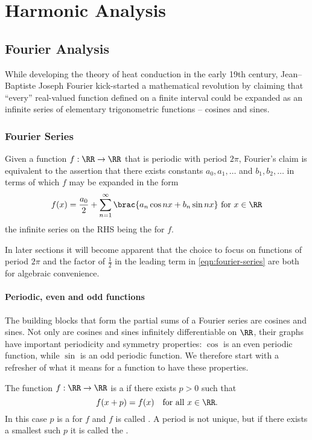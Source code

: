 \part{Harmonic Analysis}
\chapter{Fourier Analysis}
While developing the theory of heat conduction in the early 19th century, Jean--Baptiste Joseph Fourier kick-started a mathematical revolution by claiming that ``every'' real-valued function defined on a finite interval could be expanded as an infinite series of elementary trigonometric functions -- cosines and sines.

\section{Fourier Series}
Given a function $f:\RR\to\RR$ that is periodic with period $2\pi$, Fourier's claim is equivalent to the assertion that there exists constants $a_0,a_1,\dots$ and $b_1,b_2,\dots$ in terms of which $f$ may be expanded in the form
\begin{equation}\label{eqn:fourier-series}
f(x)=\frac{a_0}{2}+\sum_{n=1}^\infty\brac{a_n\cos nx+b_n\sin nx} \text{ for } x\in\RR
\end{equation}
the infinite series on the RHS being the  for $f$.

\begin{remark}
In later sections it will become apparent that the choice to focus on functions of period $2\pi$ and the factor of $\frac{1}{2}$ in the leading term in \cref{eqn:fourier-series} are both for algebraic convenience.
\end{remark}

\subsection{Periodic, even and odd functions}
The building blocks that form the partial sums of a Fourier series are cosines and sines. Not only are cosines and sines infinitely differentiable on $\RR$, their graphs have important periodicity and symmetry properties: $\cos$ is an even periodic function, while $\sin$ is an odd periodic function. We therefore start with a refresher of what it means for a function to have these properties.

\begin{definition}
The function $f:\RR\to\RR$ is a  if there exists $p>0$ such that
\[ f(x+p)=f(x) \quad \text{for all }x\in\RR. \]
In this case $p$ is a  for $f$ and $f$ is called . A period is not unique, but if there exists a smallest such $p$ it is called the .
\end{definition}

